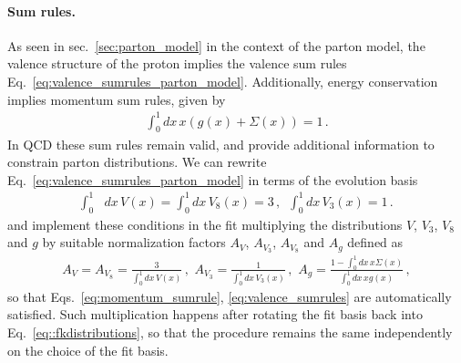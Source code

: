 %
\paragraph{Sum rules.} 
\label{sec:sumrules}
As seen in sec.~\ref{sec:parton_model} in the context of the parton model, the valence structure
of the proton implies the valence sum rules Eq.~\eqref{eq:valence_sumrules_parton_model}.
Additionally, energy conservation implies momentum sum rules, given by
\begin{align}
    \label{eq:momentum_sumrule}
    \int_0^1 dx\, x\left(g\left(x\right) + \Sigma\left(x\right)\right) = 1\,. 
\end{align}
In QCD these sum rules remain valid, and provide additional information to constrain parton distributions.
We can rewrite Eq.~\eqref{eq:valence_sumrules_parton_model} in terms of the evolution basis
\begin{align}
    \label{eq:valence_sumrules}
    \int_0^1& dx\, V\left(x\right) = \int_0^1 dx\, V_8\left(x\right) = 3\,,   \,\,\,
    \int_0^1 dx\, V_3\left(x\right) = 1\,.
\end{align} 
and implement these conditions in the fit multiplying the distributions $V$, $V_3$, $V_8$ and $g$ by suitable normalization factors
$A_V$, $A_{V_3}$, $A_{V_8}$ and $A_g$ defined as
\begin{align}
    A_V = A_{V_8} = \frac{3}{\int_0^1 dx\, V\left(x\right)}\,,\,\,
    A_{V_3} = \frac{1}{\int_0^1 dx\, V_3\left(x\right)}\,,\,\,
    A_g = \frac{1 - \int_0^1 dx\, x \Sigma\left(x\right)}{\int_0^1 dx\, x g\left(x\right)}\,,
\end{align} 
so that Eqs.~\eqref{eq:momentum_sumrule}, \eqref{eq:valence_sumrules} are automatically
satisfied.
Such multiplication happens after rotating the fit basis back into Eq.~\eqref{eq::fkdistributions},
so that the procedure remains the same independently on the choice of the fit basis.

